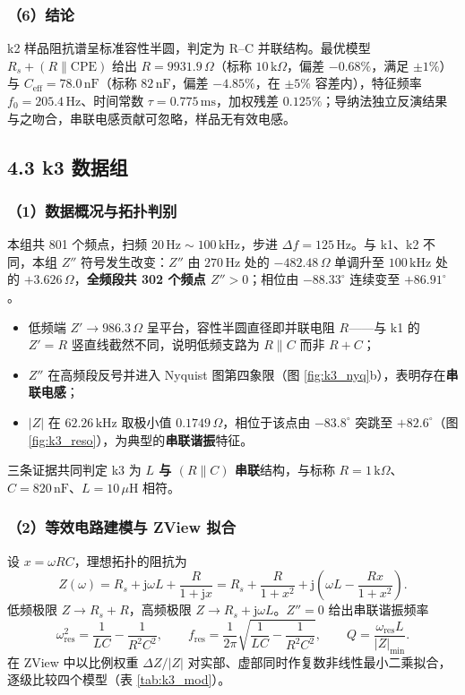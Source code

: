 \documentclass[12pt,a4paper]{ctexart}
\begin{document}
\subsubsection*{（6）结论}
k2 样品阻抗谱呈标准容性半圆，判定为 R--C 并联结构。最优模型 $R_s+(R\parallel\mathrm{CPE})$ 给出 $R=9931.9\,\Omega$（标称 $10\,\mathrm{k}\Omega$，偏差 $-0.68\%$，满足 $\pm1\%$）与 $C_{\mathrm{eff}}=78.0\,\mathrm{nF}$（标称 $82\,\mathrm{nF}$，偏差 $-4.85\%$，在 $\pm5\%$ 容差内），特征频率 $f_0=205.4\,\mathrm{Hz}$、时间常数 $\tau=0.775\,\mathrm{ms}$，加权残差 $0.125\%$；导纳法独立反演结果与之吻合，串联电感贡献可忽略，样品无有效电感。

\subsection*{4.3 k3 数据组}

\subsubsection*{（1）数据概况与拓扑判别}
本组共 801 个频点，扫频 $20\,\mathrm{Hz}\sim100\,\mathrm{kHz}$，步进 $\Delta f=125\,\mathrm{Hz}$。与 k1、k2 不同，本组 $Z''$ 符号发生改变：$Z''$ 由 $270\,\mathrm{Hz}$ 处的 $-482.48\,\Omega$ 单调升至 $100\,\mathrm{kHz}$ 处的 $+3.626\,\Omega$，\textbf{全频段共 302 个频点 $Z''>0$}；相位由 $-88.33^\circ$ 连续变至 $+86.91^\circ$。

\begin{itemize}
    \item 低频端 $Z'\to986.3\,\Omega$ 呈平台，容性半圆直径即并联电阻 $R$——与 k1 的 $Z'=R$ 竖直线截然不同，说明低频支路为 $R\parallel C$ 而非 $R+C$；
    \item $Z''$ 在高频段反号并进入 Nyquist 图第四象限（图 \ref{fig:k3_nyq}b），表明存在\textbf{串联电感}；
    \item $|Z|$ 在 $62.26\,\mathrm{kHz}$ 取极小值 $0.1749\,\Omega$，相位于该点由 $-83.8^\circ$ 突跳至 $+82.6^\circ$（图 \ref{fig:k3_reso}），为典型的\textbf{串联谐振}特征。
\end{itemize}
三条证据共同判定 k3 为 \textbf{$L$ 与 $(R\parallel C)$ 串联}结构，与标称 $R=1\,\mathrm{k}\Omega$、$C=820\,\mathrm{nF}$、$L=10\,\mu\mathrm{H}$ 相符。

\subsubsection*{（2）等效电路建模与 ZView 拟合}
设 $x=\omega R C$，理想拓扑的阻抗为
\begin{equation}
    Z(\omega)=R_s+\mathrm{j}\omega L+\frac{R}{1+\mathrm{j}x}
    =R_s+\frac{R}{1+x^2}+\mathrm{j}\!\left(\omega L-\frac{R x}{1+x^2}\right).
\end{equation}
低频极限 $Z\to R_s+R$，高频极限 $Z\to R_s+\mathrm{j}\omega L$。$Z''=0$ 给出串联谐振频率
\begin{equation}
    \omega_{\mathrm{res}}^2=\frac{1}{LC}-\frac{1}{R^2C^2},\qquad
    f_{\mathrm{res}}=\frac{1}{2\pi}\sqrt{\frac{1}{LC}-\frac{1}{R^2C^2}},
    \qquad Q=\frac{\omega_{\mathrm{res}}L}{|Z|_{\min}} .
\end{equation}
在 ZView 中以比例权重 $\Delta Z/|Z|$ 对实部、虚部同时作复数非线性最小二乘拟合，逐级比较四个模型（表 \ref{tab:k3_mod}）。
\end{document}

